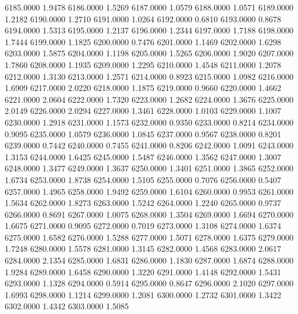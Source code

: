 6185.0000      1.9478
6186.0000      1.5269
6187.0000      1.0579
6188.0000      1.0571
6189.0000      1.2182
6190.0000      1.2710
6191.0000      1.0264
6192.0000      0.6810
6193.0000      0.8678
6194.0000      1.5313
6195.0000      1.2137
6196.0000      1.2344
6197.0000      1.7188
6198.0000      1.7444
6199.0000      1.1825
6200.0000      0.7476
6201.0000      1.1469
6202.0000      1.6298
6203.0000      1.5875
6204.0000      1.1198
6205.0000      1.5265
6206.0000      1.9020
6207.0000      1.7860
6208.0000      1.1935
6209.0000      1.2295
6210.0000      1.4548
6211.0000      1.2078
6212.0000      1.3130
6213.0000      1.2571
6214.0000      0.8923
6215.0000      1.0982
6216.0000      1.6909
6217.0000      2.0220
6218.0000      1.1875
6219.0000      0.9660
6220.0000      1.4662
6221.0000      2.0604
6222.0000      1.7320
6223.0000      1.2682
6224.0000      1.3676
6225.0000      2.0149
6226.0000      2.0294
6227.0000      1.3461
6228.0000      1.0103
6229.0000      1.1007
6230.0000      1.2918
6231.0000      1.1573
6232.0000      0.9350
6233.0000      0.8214
6234.0000      0.9095
6235.0000      1.0579
6236.0000      1.0845
6237.0000      0.9567
6238.0000      0.8201
6239.0000      0.7442
6240.0000      0.7455
6241.0000      0.8206
6242.0000      1.0091
6243.0000      1.3153
6244.0000      1.6425
6245.0000      1.5487
6246.0000      1.3562
6247.0000      1.3007
6248.0000      1.3477
6249.0000      1.3637
6250.0000      1.3401
6251.0000      1.3865
6252.0000      1.6734
6253.0000      1.8738
6254.0000      1.5105
6255.0000      0.7076
6256.0000      0.5407
6257.0000      1.4965
6258.0000      1.9492
6259.0000      1.6104
6260.0000      0.9953
6261.0000      1.5634
6262.0000      1.8273
6263.0000      1.5242
6264.0000      1.2240
6265.0000      0.9737
6266.0000      0.8691
6267.0000      1.0075
6268.0000      1.3504
6269.0000      1.6694
6270.0000      1.6675
6271.0000      0.9095
6272.0000      0.7019
6273.0000      1.3108
6274.0000      1.6374
6275.0000      1.6582
6276.0000      1.5288
6277.0000      1.5071
6278.0000      1.6375
6279.0000      1.7248
6280.0000      1.5578
6281.0000      1.3145
6282.0000      1.4568
6283.0000      2.0617
6284.0000      2.1354
6285.0000      1.6831
6286.0000      1.1830
6287.0000      1.6874
6288.0000      1.9284
6289.0000      1.6458
6290.0000      1.3220
6291.0000      1.4148
6292.0000      1.5431
6293.0000      1.1328
6294.0000      0.5914
6295.0000      0.8647
6296.0000      2.1020
6297.0000      1.6993
6298.0000      1.1214
6299.0000      1.2081
6300.0000      1.2732
6301.0000      1.3422
6302.0000      1.4342
6303.0000      1.5085
